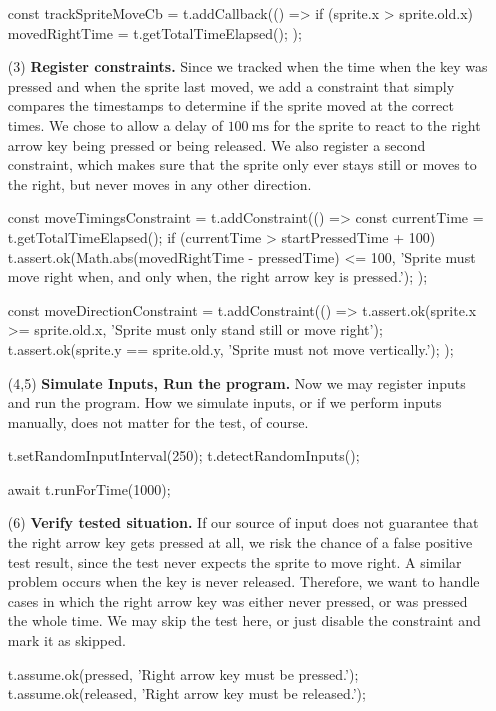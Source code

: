 \begin{enumerate}
\begin{javascriptcode}
            const trackSpriteMoveCb = t.addCallback(() => {
                if (sprite.x > sprite.old.x) {
                    movedRightTime = t.getTotalTimeElapsed();
                }
            });
        \end{javascriptcode}
    \item[(3)] \textbf{Register constraints.}
        Since we tracked when the time when the key was pressed and when the sprite last moved,
        we add a constraint that simply compares the timestamps to determine if the sprite moved at the correct times.
        We chose to allow a delay of $100~\text{ms}$ for the sprite to react to the right arrow key being pressed or being released.
        We also register a second constraint, which makes sure that the sprite only ever stays still or moves to the right,
        but never moves in any other direction.
        \begin{javascriptcode}
            const moveTimingsConstraint = t.addConstraint(() => {
                const currentTime = t.getTotalTimeElapsed();
                if (currentTime > startPressedTime + 100) {
                    t.assert.ok(Math.abs(movedRightTime - pressedTime) <= 100,
                        'Sprite must move right when, and only when, the right arrow key is pressed.');
                }
            });

            const moveDirectionConstraint = t.addConstraint(() => {
                t.assert.ok(sprite.x >= sprite.old.x,
                    'Sprite must only stand still or move right');
                t.assert.ok(sprite.y == sprite.old.y,
                    'Sprite must not move vertically.');
            });
        \end{javascriptcode}
    \item[(4,5)] \textbf{Simulate Inputs, Run the program.}
        Now we may register inputs and run the program.
        How we simulate inputs, or if we perform inputs manually, does not matter for the test, of course.
        \begin{javascriptcode}
            t.setRandomInputInterval(250);
            t.detectRandomInputs();

            await t.runForTime(1000);
        \end{javascriptcode}
    \item[(6)] \textbf{Verify tested situation.}
        If our source of input does not guarantee that the right arrow key gets pressed at all, we risk the chance of a false positive test result,
        since the test never expects the sprite to move right.
        A similar problem occurs when the key is never released.
        Therefore, we want to handle cases in which the right arrow key was either never pressed,
        or was pressed the whole time.
        We may skip the test here, or just disable the constraint and mark it as skipped.
        \begin{javascriptcode}
            t.assume.ok(pressed, 'Right arrow key must be pressed.');
            t.assume.ok(released, 'Right arrow key must be released.');
        \end{javascriptcode}
\end{enumerate}
\parspace

